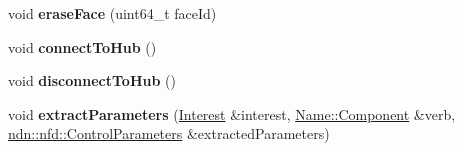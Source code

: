 \begin{DoxyCompactItemize}
\item 
void {\bfseries erase\+Face} (uint64\+\_\+t face\+Id)\hypertarget{classnfd_1_1rib_1_1tests_1_1RemoteRegistratorFixture_a83f0e5f2a7f3b43919dffb6505f511d9}{}\label{classnfd_1_1rib_1_1tests_1_1RemoteRegistratorFixture_a83f0e5f2a7f3b43919dffb6505f511d9}

\item 
void {\bfseries connect\+To\+Hub} ()\hypertarget{classnfd_1_1rib_1_1tests_1_1RemoteRegistratorFixture_a6d98d49908f210dcfc3709e73bed6c45}{}\label{classnfd_1_1rib_1_1tests_1_1RemoteRegistratorFixture_a6d98d49908f210dcfc3709e73bed6c45}

\item 
void {\bfseries disconnect\+To\+Hub} ()\hypertarget{classnfd_1_1rib_1_1tests_1_1RemoteRegistratorFixture_a26de714a56942389f832cfbf85e4d464}{}\label{classnfd_1_1rib_1_1tests_1_1RemoteRegistratorFixture_a26de714a56942389f832cfbf85e4d464}

\item 
void {\bfseries extract\+Parameters} (\hyperlink{classndn_1_1Interest}{Interest} \&interest, \hyperlink{classndn_1_1name_1_1Component}{Name\+::\+Component} \&verb, \hyperlink{classndn_1_1nfd_1_1ControlParameters}{ndn\+::nfd\+::\+Control\+Parameters} \&extracted\+Parameters)\hypertarget{classnfd_1_1rib_1_1tests_1_1RemoteRegistratorFixture_aaedb72f04c2336b1c2091c8db366b7fc}{}\label{classnfd_1_1rib_1_1tests_1_1RemoteRegistratorFixture_aaedb72f04c2336b1c2091c8db366b7fc}

\end{DoxyCompactItemize}
